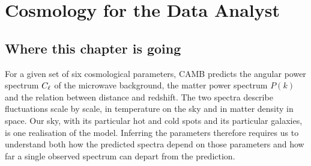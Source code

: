 \chapter{Cosmology for the Data Analyst}\label{ch:T1}

\providecommand{\TOneLmax}{}\renewcommand{\TOneLmax}{2500}
\providecommand{\TOneCosAsTauTT}{}\renewcommand{\TOneCosAsTauTT}{-0.999}
\providecommand{\TOneCosAsTauEElow}{}\renewcommand{\TOneCosAsTauEElow}{0.98}
\providecommand{\TOneAsRespHigh}{}\renewcommand{\TOneAsRespHigh}{1.41}
\providecommand{\TOneTauRespHigh}{}\renewcommand{\TOneTauRespHigh}{-1.46}
\providecommand{\TOneTauRespEElow}{}\renewcommand{\TOneTauRespEElow}{46}
\providecommand{\TOneNsPivotEll}{}\renewcommand{\TOneNsPivotEll}{542}
\providecommand{\TOneMaxRespOmc}{}\renewcommand{\TOneMaxRespOmc}{1.1}
\providecommand{\TOneDpeakEll}{}\renewcommand{\TOneDpeakEll}{220}
\providecommand{\TOneDpeak}{}\renewcommand{\TOneDpeak}{5732}
\providecommand{\TOneSigmaEight}{}\renewcommand{\TOneSigmaEight}{0.8111}
\providecommand{\TOneSigmaEightOurs}{}\renewcommand{\TOneSigmaEightOurs}{0.8112}
\providecommand{\TOneSigmaEightZone}{}\renewcommand{\TOneSigmaEightZone}{0.4928}
\providecommand{\TOneRdrag}{}\renewcommand{\TOneRdrag}{147.10}
\providecommand{\TOneRdragH}{}\renewcommand{\TOneRdragH}{99.1}
\providecommand{\TOneRpeak}{}\renewcommand{\TOneRpeak}{101.5}
\providecommand{\TOneKnl}{}\renewcommand{\TOneKnl}{0.15}
\providecommand{\TOneKnlZone}{}\renewcommand{\TOneKnlZone}{0.21}
\providecommand{\TOneKpeak}{}\renewcommand{\TOneKpeak}{0.017}
\providecommand{\TOneRatioOne}{}\renewcommand{\TOneRatioOne}{5.9}
 
\section*{Where this chapter is going}
\label{T1a:sec:roadmap}

For a given set of six cosmological parameters, CAMB \cite{CAMB2000} predicts the angular power spectrum $C_\ell$ of the microwave background, the matter power spectrum $P(k)$ and the relation between distance and redshift. The two spectra describe fluctuations scale by scale, in temperature on the sky and in matter density in space. Our sky, with its particular hot and cold spots and its particular galaxies, is one realisation of the model. Inferring the parameters therefore requires us to understand both how the predicted spectra depend on those parameters and how far a single observed spectrum can depart from the prediction.

